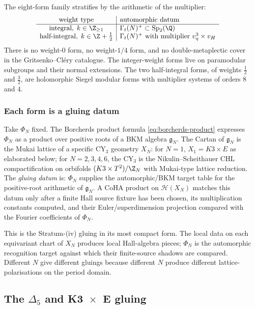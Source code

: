 The eight-form family stratifies by the arithmetic of the multiplier:
\[
 \begin{array}{c|l}
 \text{weight type} & \text{automorphic datum} \\
 \hline
 \text{integral}, \; k \in \Z_{\geq 1} & \Gamma_t(N)^+\subset \mathrm{Sp}_2(\Q) \\
 \text{half-integral}, \; k \in \Z+\tfrac12 & \Gamma_t(N)^+\text{ with multiplier }v_\eta^3\times v_H
 \end{array}
\]
There is no weight-$0$ form, no weight-$1/4$ form, and no
double-metaplectic cover in the Gritsenko--Cl\'ery catalogue. The
integer-weight forms live on paramodular subgroups and their normal
extensions. The two half-integral forms, of weights $\tfrac12$ and
$\tfrac32$, are holomorphic Siegel modular forms with multiplier
systems of orders $8$ and $4$.

\subsubsection{Each form is a gluing datum}

Take $\Phi_N$ fixed. The Borcherds product formula \eqref{eq:borcherds-product} expresses $\Phi_N$ as a product over positive roots of a BKM algebra $\mathfrak g_N$. The Cartan of $\mathfrak g_N$ is the Mukai lattice of a specific CY$_3$ geometry $X_N$: for $N = 1$, $X_1 = K3 \times E$ as elaborated below; for $N = 2, 3, 4, 6$, the CY$_3$ is the Nikulin--Scheithauer CHL compactification on orbifolds $(K3 \times T^2) / \Z_N$ with Mukai-type lattice reduction. The \emph{gluing datum} is: $\Phi_N$ supplies the automorphic/BKM target table for the positive-root arithmetic of $\mathfrak g_N$. A CoHA product on $\mathcal H(X_N)$ matches this datum only after a finite Hall source fixture has been chosen, its multiplication constants computed, and their Euler/superdimension projection compared with the Fourier coefficients of $\Phi_N$.

This is the Stratum-(iv) gluing in its most compact form. The local data on each equivariant chart of $X_N$ produces local Hall-algebra pieces; $\Phi_N$ is the automorphic recognition target against which their finite-source shadows are compared. Different $N$ give different gluings because different $N$ produce different lattice-polarisations on the period domain.

\subsection{The $\Delta_5$ and K3~$\times$~E gluing}
\label{gluech:7.4}

